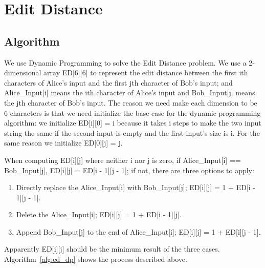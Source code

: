 \section{Edit Distance}

\subsection{Algorithm}
We use Dynamic Programming to solve the Edit Distance problem.
We use a 2-dimensional array ED[6][6] to represent the edit distance
between the first ith characters of Alice's input and the first jth character
of Bob's input; and Alice\_Input[i] means the ith character of Alice's input
and Bob\_Input[j] means the jth character of Bob's input.
The reason we need make each dimension to be 6 characters
is that we need initialize the base case for the dynamic programming algorithm:
we initialize ED[i][0] = i because it takes i steps to make the two input
string the same if the second input is empty and the first input's size is i.
For the same reason we initialize ED[0][j] = j.

When computing ED[i][j] where neither i nor j is zero, if
Alice\_Input[i] == Bob\_Input[j], ED[i][j] = ED[i - 1][j - 1];
if not, there are three options to apply:
\begin{enumerate}
    \item Directly replace the Alice\_Input[i] with Bob\_Input[j];
        ED[i][j] = 1 + ED[i - 1][j - 1].
    \item Delete the Alice\_Input[i]; ED[i][j] = 1 + ED[i - 1][j].
    \item Append Bob\_Input[j] to the end of Alice\_Input[i];
        ED[i][j] = 1 + ED[i][j - 1].
\end{enumerate}

Apparently ED[i][j] should be the minimum result of the three cases.
Algorithm~\ref{alg:ed_dp} shows the process described above.


